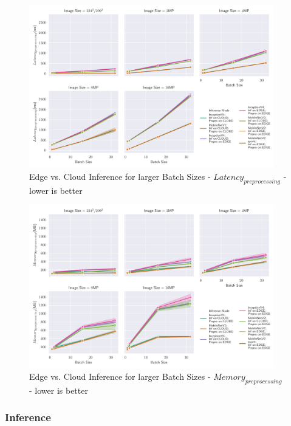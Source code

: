 \begin{figure}[!htb]
\centering
\includegraphics[width=0.95\textwidth]{./Bilder/single_plots/batch_size_plots/Effects_of_Batch_size_Preprocessing_Latencies.pdf}
\caption{Edge vs. Cloud Inference for larger Batch Sizes -  $Latency_{preprocessing}$ - lower is better}
\label{fig:BatchSizePreproLatency}
\end{figure}
\begin{figure}[!htb]
\centering
\includegraphics[width=0.95\textwidth]{./Bilder/single_plots/batch_size_plots/Effects_of_Batch_size_Preprocessing_Memory.pdf}
\caption{Edge vs. Cloud Inference for larger Batch Sizes -  $Memory_{preprocessing}$ - lower is better}
\label{fig:BatchSizePreproMemory}
\end{figure}

\FloatBarrier
\subsubsection{Inference}

